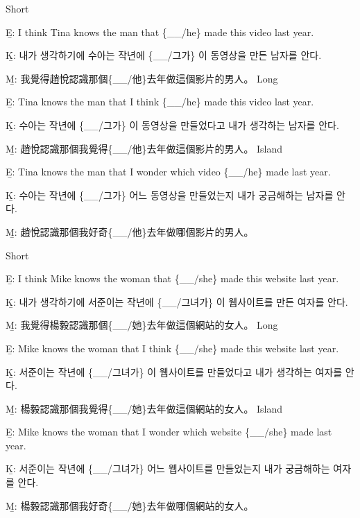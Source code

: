 \pex %
\a Short\par\nobreak
\beginsubsub
\b{E:} I think Tina knows the man that \{\_\_/he\} made this video last year.\par\nobreak
\b{K:} \ko 내가 생각하기에 수아는 작년에 \{\_\_/그가\} 이 동영상을 만든 남자를 안다. \normalfont\par\nobreak
\b{M:} \zh 我覺得趙悅認識那個\{\_\_/他\}去年做這個影片的男人。 \normalfont
\endsubsub
\a Long\par\nobreak
\beginsubsub
\b{E:} Tina knows the man that I think \{\_\_/he\} made this video last year.\par\nobreak
\b{K:} \ko 수아는 작년에 \{\_\_/그가\} 이 동영상을 만들었다고 내가 생각하는 남자를 안다. \normalfont\par\nobreak
\b{M:} \zh 趙悅認識那個我覺得\{\_\_/他\}去年做這個影片的男人。 \normalfont
\endsubsub
\a Island\par\nobreak
\beginsubsub
\b{E:} Tina knows the man that I wonder which video \{\_\_/he\} made last year.\par\nobreak
\b{K:} \ko 수아는 작년에 \{\_\_/그가\} 어느 동영상을 만들었는지 내가 궁금해하는 남자를 안다\normalfont.\par\nobreak
\b{M:} \zh 趙悅認識那個我好奇\{\_\_/他\}去年做哪個影片的男人。\normalfont
\endsubsub
\xe

\pex %
\a Short\par\nobreak
\beginsubsub
\b{E:} I think Mike knows the woman that \{\_\_/she\} made this website last year.\par\nobreak
\b{K:} \ko 내가 생각하기에 서준이는 작년에 \{\_\_/그녀가\} 이 웹사이트를 만든 여자를 안다. \normalfont\par\nobreak
\b{M:} \zh 我覺得楊毅認識那個\{\_\_/她\}去年做這個網站的女人。 \normalfont
\endsubsub
\a Long\par\nobreak
\beginsubsub
\b{E:} Mike knows the woman that I think \{\_\_/she\} made this website last year.\par\nobreak
\b{K:} \ko 서준이는 작년에 \{\_\_/그녀가\} 이 웹사이트를 만들었다고 내가 생각하는 여자를 안다. \normalfont\par\nobreak
\b{M:} \zh 楊毅認識那個我覺得\{\_\_/她\}去年做這個網站的女人。 \normalfont
\endsubsub
\a Island\par\nobreak
\beginsubsub
\b{E:} Mike knows the woman that I wonder which website \{\_\_/she\} made last year.\par\nobreak
\b{K:} \ko 서준이는 작년에 \{\_\_/그녀가\} 어느 웹사이트를 만들었는지 내가 궁금해하는 여자를 안다\normalfont.\par\nobreak
\b{M:} \zh 楊毅認識那個我好奇\{\_\_/她\}去年做哪個網站的女人。\normalfont
\endsubsub
\xe

